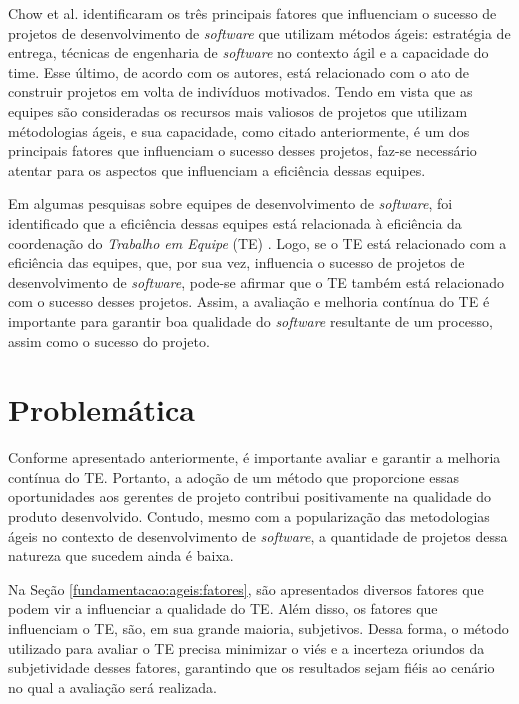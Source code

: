 Chow et al. \cite{chow} identificaram os três principais fatores que influenciam o sucesso de projetos de desenvolvimento de \textit{software} que utilizam métodos ágeis: estratégia de entrega, técnicas de engenharia de \textit{software} no contexto ágil e a capacidade do time. Esse último, de acordo com os autores, está relacionado com o ato de construir projetos em volta de indivíduos motivados. Tendo em vista que as equipes são consideradas os recursos mais valiosos de projetos que utilizam métodologias ágeis, e sua capacidade, como citado anteriormente, é um dos principais fatores que influenciam o sucesso desses projetos, faz-se necessário atentar para os aspectos que influenciam a eficiência dessas equipes.

Em algumas pesquisas sobre equipes de desenvolvimento de \textit{software}, foi identificado que a eficiência dessas equipes está relacionada à eficiência da coordenação do \textit{Trabalho em Equipe} (TE) \cite{kraut} \cite{hoegl}. Logo, se o TE está relacionado com a eficiência das equipes, que, por sua vez, influencia o sucesso de projetos de desenvolvimento de \textit{software}, pode-se afirmar que o TE também está relacionado com o sucesso desses projetos. Assim, a avaliação e melhoria contínua do TE é importante para garantir boa qualidade do \textit{software} resultante de um processo, assim como o sucesso do projeto.

\section{Problemática}
\label{introducao:problematica}

Conforme apresentado anteriormente, é importante avaliar e garantir a melhoria contínua do TE. Portanto, a adoção de um método que proporcione essas oportunidades aos gerentes de projeto contribui positivamente na qualidade do produto desenvolvido. Contudo, mesmo com a popularização das metodologias ágeis no contexto de desenvolvimento de \textit{software}, a quantidade de projetos dessa natureza que sucedem ainda é baixa.

Na Seção \ref{fundamentacao:ageis:fatores}, são apresentados diversos fatores que podem vir a influenciar a qualidade do TE. Além disso, os fatores que influenciam o TE, são, em sua grande maioria, subjetivos. Dessa forma, o método utilizado para avaliar o TE precisa minimizar o viés e a incerteza oriundos da subjetividade desses fatores, garantindo que os resultados sejam fiéis ao cenário no qual a avaliação será realizada.

